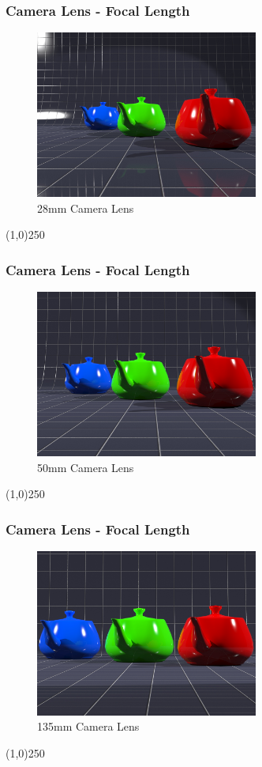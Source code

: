 \begin{frame}
\frametitle{Camera Lens - Focal Length}
\begin{figure}
	\centering
	\includegraphics[height=5.5cm]{img/Cameras/28mm.jpg}
	\caption[28mm Camera Lens]{28mm Camera Lens}
	\label{fig:28mm}
\end{figure}
\end{frame}
\begin{center}\line(1,0){250}\end{center}


\begin{frame}
\frametitle{Camera Lens - Focal Length}
\begin{figure}
	\centering
	\includegraphics[height=5.5cm]{img/Cameras/50mm.jpg}
	\caption[50mm Camera Lens]{50mm Camera Lens}
	\label{fig:50mm}
\end{figure}
\end{frame}
\begin{center}\line(1,0){250}\end{center}


\begin{frame}
\frametitle{Camera Lens - Focal Length}
\begin{figure}
	\centering
	\includegraphics[height=5.5cm]{img/Cameras/135mm.jpg}
	\caption[135mm Camera Lens]{135mm Camera Lens}
	\label{fig:135mm}
\end{figure}
\end{frame}
\begin{center}\line(1,0){250}\end{center}


